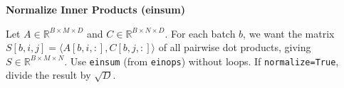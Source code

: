\item {} \textbf{Normalize Inner Products (einsum)}

Let $A \in \mathbb{R}^{B\times M\times D}$ and $C \in \mathbb{R}^{B\times N\times D}$. For each batch $b$, we want the matrix $S[b,i,j] = \langle A[b,i,:], C[b,j,:] \rangle$ of all pairwise dot products, giving $S \in \mathbb{R}^{B\times M\times N}$. Use \texttt{einsum} (from \texttt{einops}) without loops. If \texttt{normalize=True}, divide the result by $\sqrt{D}$.

